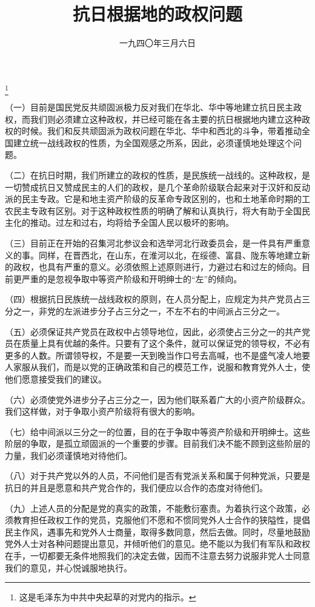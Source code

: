 
\title{抗日根据地的政权问题}
\date{一九四〇年三月六日}
\thanks{这是毛泽东为中共中央起草的对党内的指示。}
\maketitle


（一）目前是国民党反共顽固派极力反对我们在华北、华中等地建立抗日民主政权，而我们则必须建立这种政权，并已经可能在各主要的抗日根据地内建立这种政权的时候。我们和反共顽固派为政权问题在华北、华中和西北的斗争，带着推动全国建立统一战线政权的性质，为全国观感之所系，因此，必须谨慎地处理这个问题。

（二）在抗日时期，我们所建立的政权的性质，是民族统一战线的。这种政权，是一切赞成抗日又赞成民主的人们的政权，是几个革命阶级联合起来对于汉奸和反动派的民主专政。它是和地主资产阶级的反革命专政区别的，也和土地革命时期的工农民主专政有区别。对于这种政权性质的明确了解和认真执行，将大有助于全国民主化的推动。过左和过右，均将给予全国人民以极坏的影响。

（三）目前正在开始的召集河北参议会和选举河北行政委员会，是一件具有严重意义的事。同样，在晋西北，在山东，在淮河以北，在绥德、富县、陇东等地建立新的政权，也具有严重的意义。必须依照上述原则进行，力避过右和过左的倾向。目前更严重的是忽视争取中等资产阶级和开明绅士的“左”的倾向。

（四）根据抗日民族统一战线政权的原则，在人员分配上，应规定为共产党员占三分之一，非党的左派进步分子占三分之一，不左不右的中间派占三分之一。

（五）必须保证共产党员在政权中占领导地位，因此，必须使占三分之一的共产党员在质量上具有优越的条件。只要有了这个条件，就可以保证党的领导权，不必有更多的人数。所谓领导权，不是要一天到晚当作口号去高喊，也不是盛气凌人地要人家服从我们，而是以党的正确政策和自己的模范工作，说服和教育党外人士，使他们愿意接受我们的建议。

（六）必须使党外进步分子占三分之一，因为他们联系着广大的小资产阶级群众。我们这样做，对于争取小资产阶级将有很大的影响。

（七）给中间派以三分之一的位置，目的在于争取中等资产阶级和开明绅士。这些阶层的争取，是孤立顽固派的一个重要的步骤。目前我们决不能不顾到这些阶层的力量，我们必须谨慎地对待他们。

（八）对于共产党以外的人员，不问他们是否有党派关系和属于何种党派，只要是抗日的并且是愿意和共产党合作的，我们便应以合作的态度对待他们。

（九）上述人员的分配是党的真实的政策，不能敷衍塞责。为着执行这个政策，必须教育担任政权工作的党员，克服他们不愿和不惯同党外人士合作的狭隘性，提倡民主作风，遇事先和党外人士商量，取得多数同意，然后去做。同时，尽量地鼓励党外人士对各种问题提出意见，并倾听他们的意见。绝不能以为我们有军队和政权在手，一切都要无条件地照我们的决定去做，因而不注意去努力说服非党人士同意我们的意见，并心悦诚服地执行。


